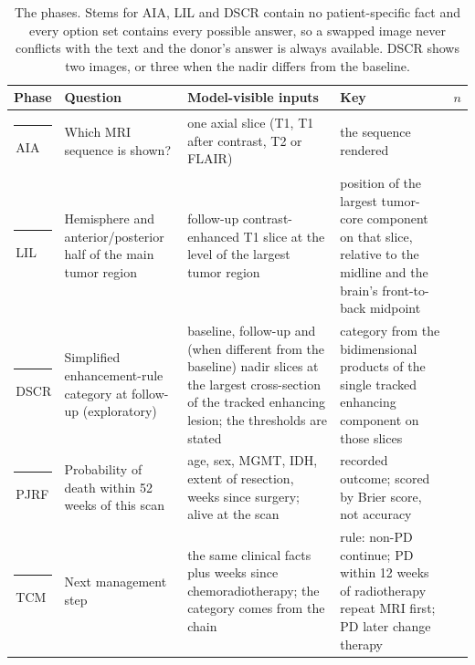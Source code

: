 \documentclass[conference]{IEEEtran}
\newcommand{\hdrrow}{\rowcolor{tblhdr}}
\newcommand{\bandrow}{\rowcolor{tblband}}
\newcommand{\ptag}[2]{\textcolor{#1}{\rule[0.02em]{0.72em}{0.72em}}\,#2}
\newcommand{\ptagAIA}{\ptag{aiacol}{AIA}}
\newcommand{\ptagLIL}{\ptag{lilcol}{LIL}}
\newcommand{\ptagDSCR}{\ptag{dscrcol}{DSCR}}
\newcommand{\ptagPJRF}{\ptag{pjrfcol}{PJRF}}
\newcommand{\ptagTCM}{\ptag{tcmcol}{TCM}}
\begin{document}
\begin{table}[t]
\centering
\footnotesize
\setlength{\tabcolsep}{3pt}
\begin{tabular}{p{1.3cm}p{4.1cm}p{4.4cm}p{4.4cm}r}
\toprule
\hdrrow Phase & Question & Model-visible inputs & Key & $n$ \\
\midrule
\ptagAIA & Which MRI sequence is shown? & one axial slice (T1, T1 after contrast, T2 or FLAIR) & the sequence rendered & \vfourNAIA{} \\
\bandrow \ptagLIL & Hemisphere and anterior/posterior half of the main tumor region & follow-up contrast-enhanced T1 slice at the level of the largest tumor region & position of the largest tumor-core component on that slice, relative to the midline and the brain's front-to-back midpoint & \vfourNLIL{} \\
\ptagDSCR & Simplified enhancement-rule category at follow-up (exploratory) & baseline, follow-up and (when different from the baseline) nadir slices at the largest cross-section of the tracked enhancing lesion; the thresholds are stated & category from the bidimensional products of the single tracked enhancing component on those slices & \vfourNDSCR{} \\
\bandrow \ptagPJRF & Probability of death within 52 weeks of this scan & age, sex, MGMT, IDH, extent of resection, weeks since surgery; alive at the scan & recorded outcome; scored by Brier score, not accuracy & \vfourNPJRF{} \\
\ptagTCM & Next management step & the same clinical facts plus weeks since chemoradiotherapy; the category comes from the chain & rule: non-PD continue; PD within 12 weeks of radiotherapy repeat MRI first; PD later change therapy & \vfourNTCM{} \\
\bottomrule
\end{tabular}
\caption{The phases. Stems for AIA, LIL and DSCR contain no patient-specific fact and every option set contains every possible answer, so a swapped image never conflicts with the text and the donor's answer is always available. DSCR shows two images, or three when the nadir differs from the baseline.}
\label{tab:phases}
\end{table}
\end{document}
